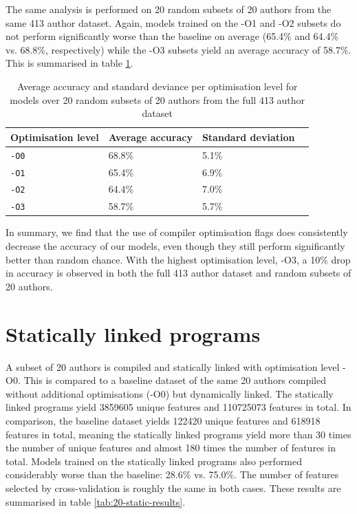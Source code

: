\documentclass[a4paper,11pt]{kth-mag}
\begin{document}
The same analysis is performed on 20 random subsets of 20 authors from the same
413 author dataset. Again, models trained on the -O1 and -O2 subsets do not
perform significantly worse than the baseline on average (65.4\% and 64.4\%
vs. 68.8\%, respectively) while the -O3 subsets yield an average accuracy of
58.7\%. This is summarised in table \ref{tab:20-results}.

\begin{table}[!htb]
    \centering
    \caption{Average accuracy and standard deviance per optimisation level for
    models over 20 random subsets of 20 authors from the full 413 author
    dataset}
        \begin{tabular}{ l l l l }
        Optimisation level & Average accuracy & Standard deviation \\
        \hline
        \lstinline{-O0} & 68.8\% & 5.1\% \\
        \lstinline{-O1} & 65.4\% & 6.9\% \\
        \lstinline{-O2} & 64.4\% & 7.0\% \\
        \lstinline{-O3} & 58.7\% & 5.7\% 
        \end{tabular}
       \label{tab:20-results}
\end{table}

In summary, we find that the use of compiler optimisation flags does
consistently decrease the accuracy of our models, even though they still
perform significantly better than random chance. With the highest optimisation
level, -O3, a 10\% drop in accuracy is observed in both the full 413 author
dataset and random subsets of 20 authors.

\section{Statically linked programs}
A subset of 20 authors is compiled and statically linked with optimisation
level -O0. This is compared to a baseline dataset of the same 20 authors
compiled without additional optimisations (-O0) but dynamically linked. The
statically linked programs yield 3859605 unique features and 110725073 features
in total. In comparison, the baseline dataset yields 122420 unique features and
618918 features in total, meaning the statically linked programs yield more
than 30 times the number of unique features and almost 180 times the number of
features in total. Models trained on the statically linked programs also
performed considerably worse than the baseline: 28.6\% vs. 75.0\%. The number of
features selected by cross-validation is roughly the same in both cases. These
results are summarised in table \ref{tab:20-static-results}.
\end{document}
